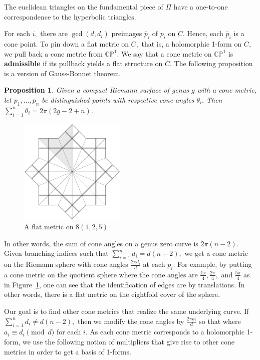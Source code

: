 \documentclass[12pt,reqno]{amsart}
\newtheorem*{proposition}{Proposition}
\theoremstyle{definition}
\theoremstyle{remark}
\begin{document}
The euclidean triangles on the fundamental piece of $\Pi$ have a one-to-one correspondence to the hyperbolic triangles.

For each $i,$ there are $\gcd(d, d_i)$ preimages $\widetilde{p_i}$ of $p_i$ on $C.$ Hence, each $\widetilde{p_i}$ is a cone point. To pin down a flat metric on $C,$ that is, a holomorphic 1-form on $C,$ we pull back a cone metric from $\mathbb{C}\mathbb{P}^1.$ We say that a cone metric on $\mathbb{C}\mathbb{P}^1$ is \textbf{admissible} if its pullback yields a flat structure on $C.$ The following proposition is a version of Gauss-Bonnet theorem.

\begin{proposition} Given a compact Riemann surface of genus $g$ with a cone metric, let $p_1, \ldots, p_n$ be distinguished points with respective cone angles $\theta_i.$ Then $\sum\limits_{i=1}^n \theta_i = 2 \pi (2 g - 2 + n).$
\end{proposition}

\begin{figure}[htbp] %
   \centering
   \includegraphics[width=2in]{figures/125_flat.pdf} 
	\caption{A flat metric on $8(1, 2, 5)$}
	\label{fig:125_flat}
\end{figure}

In other words, the sum of cone angles on a genus zero curve is $2 \pi (n - 2).$ Given branching indices such that $\sum\limits_{i=1}^n d_i = d (n - 2),$ we get a cone metric on the Riemann sphere with cone angles $\frac{2 \pi d_i}{d}$ at each $p_i.$ For example, by putting a cone metric on the quotient sphere where the cone angles are $\frac{1 \pi}{4}, \frac{2 \pi}{4},$ and $\frac{5 \pi}{4}$ as in Figure~\ref{fig:125_flat}, one can see that the identification of edges are by translations. In other words, there is a flat metric on the eightfold cover of the sphere. 

Our goal is to find other cone metrics that realize the same underlying curve. If $\sum\limits_{i=1}^n d_i \neq d (n - 2),$ then we modify the cone angles by $\frac{2 \pi a_i}{d}$ so that where $a_i \equiv d_i \pmod d$ for each $i.$ As each cone metric corresponds to a holomorphic 1-form, we use the following notion of multipliers that give rise to other cone metrics in order to get a basis of 1-forms.
\end{document}
